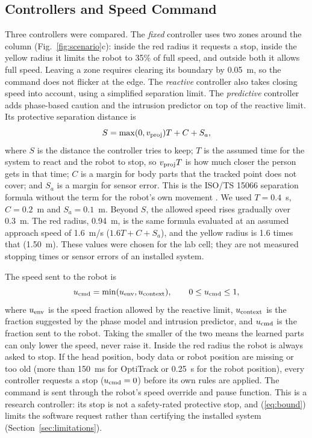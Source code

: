 \documentclass{IEEEtran}
\begin{document}
\subsection{Controllers and Speed Command}
Three controllers were compared. The \emph{fixed} controller uses two zones
around the column (Fig.~\ref{fig:scenario}c): inside the red radius it requests
a stop, inside the yellow radius it limits the robot to 35\% of full speed,
and outside both it allows full speed. Leaving a zone requires clearing its
boundary by 0.05~m, so the command does not flicker at the edge. The \emph{reactive} controller also
takes closing speed into account, using a simplified separation limit. The
\emph{predictive} controller adds phase-based caution and the intrusion
predictor on top of the reactive limit. Its protective separation distance is
\begin{equation}
S=\max(0,v_{\rm proj})T+C+S_a,
\end{equation}
where $S$ is the distance the controller tries to keep; $T$ is the assumed time
for the system to react and the robot to stop, so $v_{\rm proj}T$ is how much
closer the person gets in that time; $C$ is a margin for body parts that the
tracked point does not cover; and $S_a$ is a margin for sensor error. This is
the ISO/TS 15066 separation formula without the term for the robot's own
movement \cite{iso15066}. We used $T=0.4$~s, $C=0.2$~m and $S_a=0.1$~m. Beyond
$S$, the allowed speed rises gradually over 0.3~m. The red radius, 0.94~m,
is the same formula evaluated at an assumed approach speed of 1.6~m/s
($1.6T+C+S_a$), and the yellow radius is 1.6 times that (1.50~m). These values were chosen for
the lab cell; they are not measured stopping times or sensor errors of an
installed system.

The speed sent to the robot is
\begin{equation}
u_{\rm cmd}=\min(u_{\rm env},u_{\rm context}),\qquad 0\le u_{\rm cmd}\le1,
\label{eq:bound}
\end{equation}
where $u_{\rm env}$ is the speed fraction allowed by the reactive limit,
$u_{\rm context}$ is the fraction suggested by the phase model and intrusion
predictor, and $u_{\rm cmd}$ is the fraction sent to the robot. Taking the
smaller of the two means the learned parts can only lower the speed, never
raise it. Inside the red radius the robot is always asked to stop. If the head
position, body data or robot position are missing or too old (more than
150~ms for OptiTrack or 0.25~s for the robot position), every controller
requests a stop ($u_{\rm cmd}=0$) before its own rules are applied. The
command is sent through the robot's speed override and pause function. This
is a research controller: its stop is not a safety-rated protective stop, and
(\ref{eq:bound}) limits the software request rather than certifying the
installed system (Section~\ref{sec:limitations}).
\end{document}
